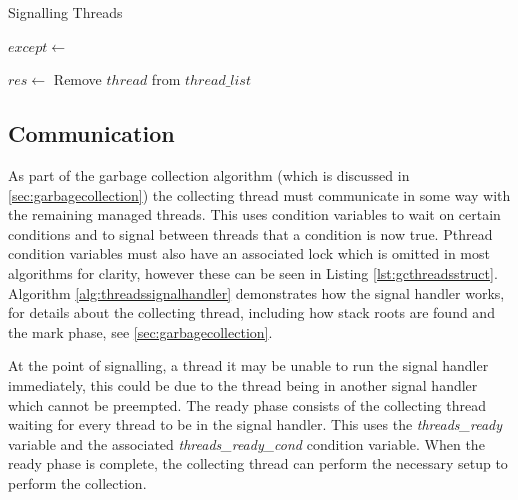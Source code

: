 \documentclass[../diss.tex]{subfiles}
\begin{document}
\begin{algorithm}
\caption{Signalling Threads}
\label{alg:threadsignal}
\begin{algorithmic}


\State $except\gets $ 

\State {}


        
        \State $res\gets$ 
            \State Remove $thread$ from $thread\_list$
        \EndIf
        
    \EndIf

\EndFor

\State {}

\EndFunction

\end{algorithmic}
\end{algorithm}


\subsection{Communication} \label{sec:communication}

As part of the garbage collection algorithm (which is discussed in \cref{sec:garbagecollection}) the collecting thread must communicate in some way with the remaining managed threads. This uses condition variables to wait on certain conditions and to signal between threads that a condition is now true. Pthread condition variables must also have an associated lock which is omitted in most algorithms for clarity, however these can be seen in Listing \ref{lst:gcthreadsstruct}. Algorithm \ref{alg:threadssignalhandler} demonstrates how the signal handler works, for details about the collecting thread, including how stack roots are found and the mark phase, see \cref{sec:garbagecollection}.

At the point of signalling, a thread it may be unable to run the signal handler immediately, this could be due to the thread being in another signal handler which cannot be preempted. The ready phase consists of the collecting thread waiting for every thread to be in the signal handler. This uses the \emph{threads\_ready} variable and the associated \emph{threads\_ready\_cond} condition variable. When the ready phase is complete, the collecting thread can perform the necessary setup to perform the collection.
\end{document}
